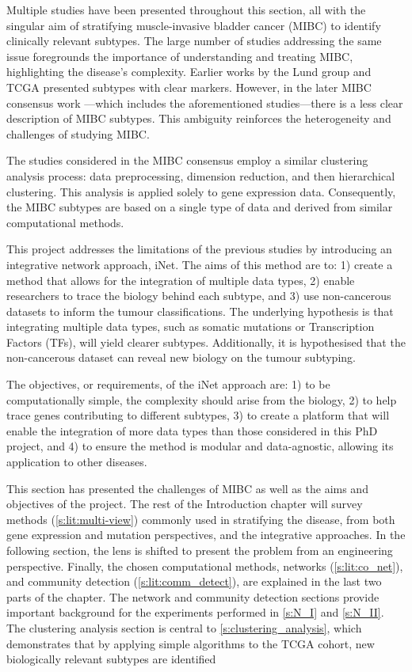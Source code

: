 Multiple studies have been presented throughout this section, all with the singular aim of stratifying muscle-invasive bladder cancer (MIBC) to identify clinically relevant subtypes. The large number of studies addressing the same issue foregrounds the importance of understanding and treating MIBC, highlighting the disease's complexity. Earlier works by the Lund group \cite{Sjodahl2017-xr, Marzouka2018-ge} and TCGA \cite{Tcga2014-dr, Robertson2017-mg} presented subtypes with clear markers. However, in the later MIBC consensus work \cite{Kamoun2020-tj}—which includes the aforementioned studies—there is a less clear description of MIBC subtypes. This ambiguity reinforces the heterogeneity and challenges of studying MIBC.

The studies considered in the MIBC consensus employ a similar clustering analysis process: data preprocessing, dimension reduction, and then hierarchical clustering. This analysis is applied solely to gene expression data. Consequently, the MIBC subtypes are based on a single type of data and derived from similar computational methods.

This project addresses the limitations of the previous studies by introducing an integrative network approach, iNet. The aims of this method are to: 1) create a method that allows for the integration of multiple data types, 2) enable researchers to trace the biology behind each subtype, and 3) use non-cancerous datasets to inform the tumour classifications. The underlying hypothesis is that integrating multiple data types, such as somatic mutations or Transcription Factors (TFs), will yield clearer subtypes. Additionally, it is hypothesised that the non-cancerous dataset can reveal new biology on the tumour subtyping.

The objectives, or requirements, of the iNet approach are: 1) to be computationally simple, the complexity should arise from the biology, 2) to help trace genes contributing to different subtypes, 3) to create a platform that will enable the integration of more data types than those considered in this PhD project, and 4) to ensure the method is modular and data-agnostic, allowing its application to other diseases.

This section has presented the challenges of MIBC as well as the aims and objectives of the project. The rest of the Introduction chapter will survey methods (\cref{s:lit:multi-view}) commonly used in stratifying the disease, from both gene expression and mutation perspectives, and the integrative approaches. In the following section, the lens is shifted to present the problem from an engineering perspective. Finally, the chosen computational methods, networks (\cref{s:lit:co_net}), and community detection (\cref{s:lit:comm_detect}), are explained in the last two parts of the chapter. The network and community detection sections provide important background for the experiments performed in \cref{s:N_I} and \cref{s:N_II}. The clustering analysis section is central to \cref{s:clustering_analysis}, which demonstrates that by applying simple algorithms to the TCGA cohort, new biologically relevant subtypes are identified
